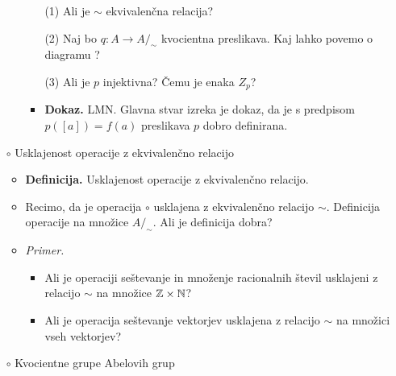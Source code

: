 \begin{enumerate}
\begin{itemize}
        \begin{enumerate}
            \item[(1)] Ali je $\sim$ ekvivalenčna relacija?
            \item[(2)] Naj bo $q: A \to A/_\sim$ kvocientna preslikava. Kaj lahko povemo o diagramu ?
            \item[(3)] Ali je $p$ injektivna? Čemu je enaka $Z_p$?            
        \end{enumerate}
        \begin{itemize}
            \item \colorbox{green!30}{\textbf{Dokaz.}} LMN. Glavna stvar izreka je dokaz, da je s predpisom $p([a]) = f(a)$ preslikava $p$ dobro definirana.
        \end{itemize}
    \end{itemize}

    \item[$\circ$] Usklajenost operacije z ekvivalenčno relacijo
    \begin{itemize}
        \item \colorbox{purple!30}{\textbf{Definicija.}} Usklajenost operacije z ekvivalenčno relacijo.
        \item Recimo, da je operacija $\circ$ usklajena z ekvivalenčno relacijo $\sim$. Definicija operacije na množice $A/_\sim$. Ali je definicija dobra?
        \item \colorbox{yellow!30}{\emph{Primer.}}  
        \begin{itemize}
            \item Ali je operaciji seštevanje in množenje racionalnih števil usklajeni z relacijo $\sim$ na množice $\mathbb{Z} \times \mathbb{N}$?
            \item Ali je operacija seštevanje vektorjev usklajena z relacijo $\sim$ na množici vseh vektorjev?
        \end{itemize}
    \end{itemize}
    
   
    \item[$\circ$] Kvocientne grupe Abelovih grup
    

\end{enumerate}
